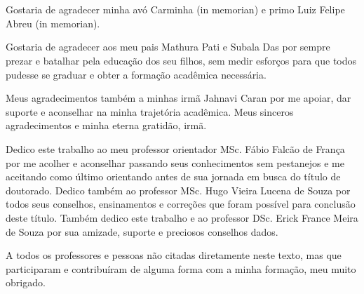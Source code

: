 \section*{} 

\begin{justify}
	\singlespacing
	Gostaria de agradecer minha avó Carminha (in memorian) e primo Luiz Felipe Abreu (in memorian).

	Gostaria de agradecer aos meu pais Mathura Pati e Subala Das por sempre prezar e batalhar pela educação dos seu filhos, sem medir esforços para que todos pudesse se graduar e obter a formação acadêmica necessária.

	Meus agradecimentos também a minhas irmã Jahnavi Caran por me apoiar, dar suporte e aconselhar na minha trajetória acadêmica. Meus sinceros agradecimentos e minha eterna gratidão, irmã.

	Dedico este trabalho ao meu professor orientador MSc. Fábio Falcão de França por me acolher e aconselhar passando seus conhecimentos sem pestanejos e me aceitando como último orientando antes de sua jornada em busca do título de doutorado. Dedico também ao professor MSc. Hugo Vieira Lucena de Souza por todos seus conselhos, ensinamentos e correções que foram possível para conclusão deste título. Também dedico este trabalho e ao professor DSc. Erick France Meira de Souza por sua amizade, suporte e preciosos conselhos dados.

	A todos os professores e pessoas não citadas diretamente neste texto, mas que participaram e contribuíram de alguma forma com a minha formação, meu muito obrigado.
\end{justify}
